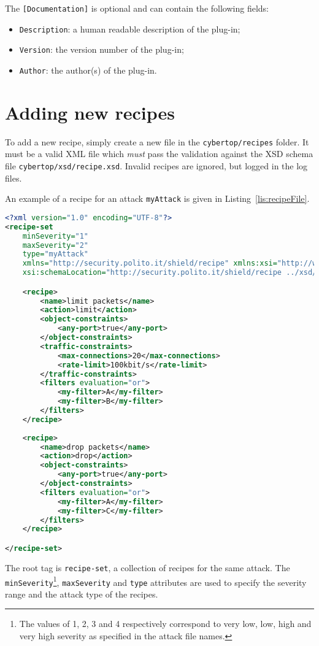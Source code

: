 \documentclass{scrartcl}
\begin{document}
The \lstinline|[Documentation]| is optional and can contain the following fields:

\begin{itemize}
	\item \lstinline|Description|: a human readable description of the plug-in;
	\item \lstinline|Version|: the version number of the plug-in;
	\item \lstinline|Author|: the author(s) of the plug-in.
\end{itemize}

\section{Adding new recipes}
\label{sec:addingNewRecipes}

To add a new recipe, simply create a new file in the \lstinline|cybertop/recipes| folder. It must be a valid XML file which \emph{must} pass the validation against the XSD schema file \lstinline|cybertop/xsd/recipe.xsd|. Invalid recipes are ignored, but logged in the log files.

An example of a recipe for an attack \lstinline|myAttack| is given in Listing~\ref{lis:recipeFile}.

\begin{lstlisting}[language = XML, caption = Example of a recipe., label = lis:recipeFile]
<?xml version="1.0" encoding="UTF-8"?>
<recipe-set
	minSeverity="1"
	maxSeverity="2"
	type="myAttack"
	xmlns="http://security.polito.it/shield/recipe" xmlns:xsi="http://www.w3.org/2001/XMLSchema-instance"
	xsi:schemaLocation="http://security.polito.it/shield/recipe ../xsd/recipe.xsd">

	<recipe>
		<name>limit packets</name>
		<action>limit</action>
		<object-constraints>
			<any-port>true</any-port>
		</object-constraints>
		<traffic-constraints>
			<max-connections>20</max-connections>
			<rate-limit>100kbit/s</rate-limit>
		</traffic-constraints>
		<filters evaluation="or">
			<my-filter>A</my-filter>
			<my-filter>B</my-filter>
		</filters>
	</recipe>
	
	<recipe>
		<name>drop packets</name>
		<action>drop</action>
		<object-constraints>
			<any-port>true</any-port>
		</object-constraints>
		<filters evaluation="or">
			<my-filter>A</my-filter>
			<my-filter>C</my-filter>
		</filters>
	</recipe>

</recipe-set>
\end{lstlisting}

The root tag is \lstinline|recipe-set|, a collection of recipes for the same attack. The \lstinline|minSeverity|\footnote{\label{foo:severity}The values of 1, 2, 3 and 4 respectively correspond to very low, low, high and very high severity as specified in the attack file names.}, \lstinline|maxSeverity| and \lstinline|type| attributes are used to specify the severity range and the attack type of the recipes.
\end{document}

